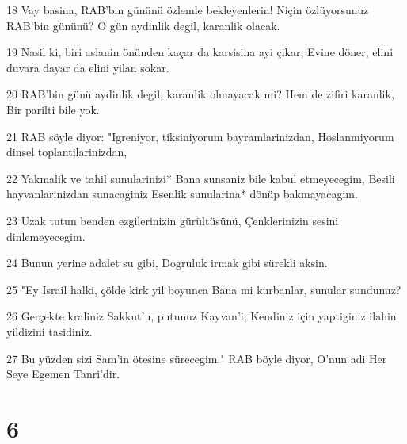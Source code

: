\par 18 Vay basina, RAB'bin gününü özlemle bekleyenlerin! Niçin özlüyorsunuz RAB'bin gününü? O gün aydinlik degil, karanlik olacak.
\par 19 Nasil ki, biri aslanin önünden kaçar da karsisina ayi çikar, Evine döner, elini duvara dayar da elini yilan sokar.
\par 20 RAB'bin günü aydinlik degil, karanlik olmayacak mi? Hem de zifiri karanlik, Bir parilti bile yok.
\par 21 RAB söyle diyor: "Igreniyor, tiksiniyorum bayramlarinizdan, Hoslanmiyorum dinsel toplantilarinizdan,
\par 22 Yakmalik ve tahil sunularinizi* Bana sunsaniz bile kabul etmeyecegim, Besili hayvanlarinizdan sunacaginiz Esenlik sunularina* dönüp bakmayacagim.
\par 23 Uzak tutun benden ezgilerinizin gürültüsünü, Çenklerinizin sesini dinlemeyecegim.
\par 24 Bunun yerine adalet su gibi, Dogruluk irmak gibi sürekli aksin.
\par 25 "Ey Israil halki, çölde kirk yil boyunca Bana mi kurbanlar, sunular sundunuz?
\par 26 Gerçekte kraliniz Sakkut'u, putunuz Kayvan'i, Kendiniz için yaptiginiz ilahin yildizini tasidiniz.
\par 27 Bu yüzden sizi Sam'in ötesine sürecegim." RAB böyle diyor, O'nun adi Her Seye Egemen Tanri'dir.

\chapter{6}

